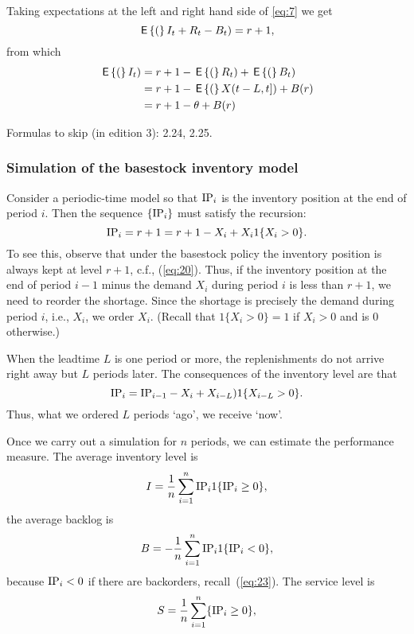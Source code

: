 Taking expectations at the left and right hand side of \ref{eq:7} we get
\begin{equation*}
  \,\mathsf{E}\left\{(\right\}I_t + R_t - B_t) = r+1,
\end{equation*}
from which
\begin{equation}
  \label{eq:6}
  \begin{split}
  \,\mathsf{E}\left\{(\right\}I_t)
  &= r+1 - \,\mathsf{E}\left\{(\right\}R_t) + \,\mathsf{E}\left\{(\right\}B_t)  \\
  & = r + 1 - \,\mathsf{E}\left\{(\right\}X(t-L, t]) + B(r) \\
  & = r + 1 - \theta + B(r) \\
  \end{split}
\end{equation}

Formulas to skip (in edition 3): 2.24, 2.25. 


\subsubsection{Simulation of the basestock inventory model}
\label{sec:simul-basest-invent}

Consider a periodic-time model so that $\textrm{IP}_i$ is the inventory position at the end of period $i$. Then the sequence $\{\textrm{IP}_i\}$ must satisfy the recursion:
\begin{equation}
  \label{eq:15}
  \textrm{IP}_i = r+1 = r+1 - X_i + X_i 1\{X_i>0\}.
\end{equation}
To see this, observe that under the basestock policy the inventory
position is always kept at level $r+1$, c.f., (\ref{eq:20}). Thus, if
the inventory position at the end of period $i-1$ minus the demand
$X_i$ during period $i$ is less than $r+1$, we need to reorder the
shortage. Since the shortage is precisely the demand during period
$i$, i.e., $X_i$, we order $X_i$. (Recall that $1\{X_i>0\} = 1$ if
$X_i>0$ and is $0$ otherwise.)

When the leadtime $L$ is one period or more, the replenishments do not arrive right away but $L$ periods later. The consequences of the inventory level are that
\begin{equation}
  \label{eq:21}
  \textrm{IP}_i = \textrm{IP}_{i-1} - X_i + X_{i-L})1\{X_{i-L}>0\}.
\end{equation}
Thus, what we ordered $L$ periods `ago', we receive `now'.

Once we carry out a simulation for $n$ periods, we can estimate the
performance measure. The average inventory level is
\begin{equation}
  \label{eq:22}
  I = \frac 1n \sum_{i=1}^n \textrm{IP}_i1\{\textrm{IP}_i \geq 0\},
\end{equation}
the average backlog  is
\begin{equation}
  B = - \frac 1n \sum_{i=1}^n \textrm{IP}_i1\{\textrm{IP}_i < 0\},
\end{equation}
because $\textrm{IP}_i<0$ if there are backorders, recall~(\ref{eq:23}). 
The service level is 
\begin{equation}
  \label{eq:22}
  S = \frac 1n \sum_{i=1}^n \{\textrm{IP}_i \geq 0\},
\end{equation}




